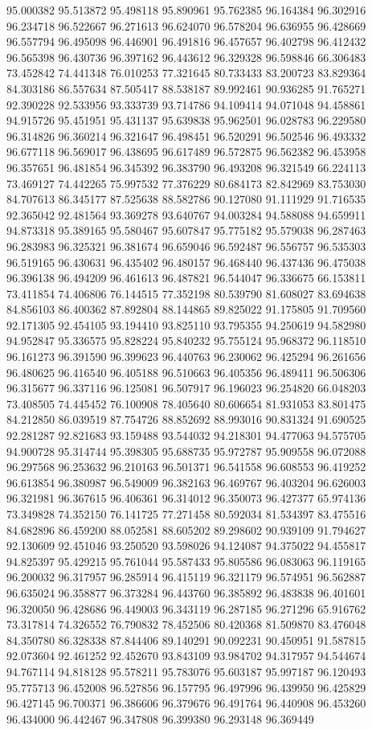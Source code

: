 95.000382
95.513872
95.498118
95.890961
95.762385
96.164384
96.302916
96.234718
96.522667
96.271613
96.624070
96.578204
96.636955
96.428669
96.557794
96.495098
96.446901
96.491816
96.457657
96.402798
96.412432
96.565398
96.430736
96.397162
96.443612
96.329328
96.598846
66.306483
73.452842
74.441348
76.010253
77.321645
80.733433
83.200723
83.829364
84.303186
86.557634
87.505417
88.538187
89.992461
90.936285
91.765271
92.390228
92.533956
93.333739
93.714786
94.109414
94.071048
94.458861
94.915726
95.451951
95.431137
95.639838
95.962501
96.028783
96.229580
96.314826
96.360214
96.321647
96.498451
96.520291
96.502546
96.493332
96.677118
96.569017
96.438695
96.617489
96.572875
96.562382
96.453958
96.357651
96.481854
96.345392
96.383790
96.493208
96.321549
66.224113
73.469127
74.442265
75.997532
77.376229
80.684173
82.842969
83.753030
84.707613
86.345177
87.525638
88.582786
90.127080
91.111929
91.716535
92.365042
92.481564
93.369278
93.640767
94.003284
94.588088
94.659911
94.873318
95.389165
95.580467
95.607847
95.775182
95.579038
96.287463
96.283983
96.325321
96.381674
96.659046
96.592487
96.556757
96.535303
96.519165
96.430631
96.435402
96.480157
96.468440
96.437436
96.475038
96.396138
96.494209
96.461613
96.487821
96.544047
96.336675
66.153811
73.411854
74.406806
76.144515
77.352198
80.539790
81.608027
83.694638
84.856103
86.400362
87.892804
88.144865
89.825022
91.175805
91.709560
92.171305
92.454105
93.194410
93.825110
93.795355
94.250619
94.582980
94.952847
95.336575
95.828224
95.840232
95.755124
95.968372
96.118510
96.161273
96.391590
96.399623
96.440763
96.230062
96.425294
96.261656
96.480625
96.416540
96.405188
96.510663
96.405356
96.489411
96.506306
96.315677
96.337116
96.125081
96.507917
96.196023
96.254820
66.048203
73.408505
74.445452
76.100908
78.405640
80.606654
81.931053
83.801475
84.212850
86.039519
87.754726
88.852692
88.993016
90.831324
91.690525
92.281287
92.821683
93.159488
93.544032
94.218301
94.477063
94.575705
94.900728
95.314744
95.398305
95.688735
95.972787
95.909558
96.072088
96.297568
96.253632
96.210163
96.501371
96.541558
96.608553
96.419252
96.613854
96.380987
96.549009
96.382163
96.469767
96.403204
96.626003
96.321981
96.367615
96.406361
96.314012
96.350073
96.427377
65.974136
73.349828
74.352150
76.141725
77.271458
80.592034
81.534397
83.475516
84.682896
86.459200
88.052581
88.605202
89.298602
90.939109
91.794627
92.130609
92.451046
93.250520
93.598026
94.124087
94.375022
94.455817
94.825397
95.429215
95.761044
95.587433
95.805586
96.083063
96.119165
96.200032
96.317957
96.285914
96.415119
96.321179
96.574951
96.562887
96.635024
96.358877
96.373284
96.443760
96.385892
96.483838
96.401601
96.320050
96.428686
96.449003
96.343119
96.287185
96.271296
65.916762
73.317814
74.326552
76.790832
78.452506
80.420368
81.509870
83.476048
84.350780
86.328338
87.844406
89.140291
90.092231
90.450951
91.587815
92.073604
92.461252
92.452670
93.843109
93.984702
94.317957
94.544674
94.767114
94.818128
95.578211
95.783076
95.603187
95.997187
96.120493
95.775713
96.452008
96.527856
96.157795
96.497996
96.439950
96.425829
96.427145
96.700371
96.386606
96.379676
96.491764
96.440908
96.453260
96.434000
96.442467
96.347808
96.399380
96.293148
96.369449
